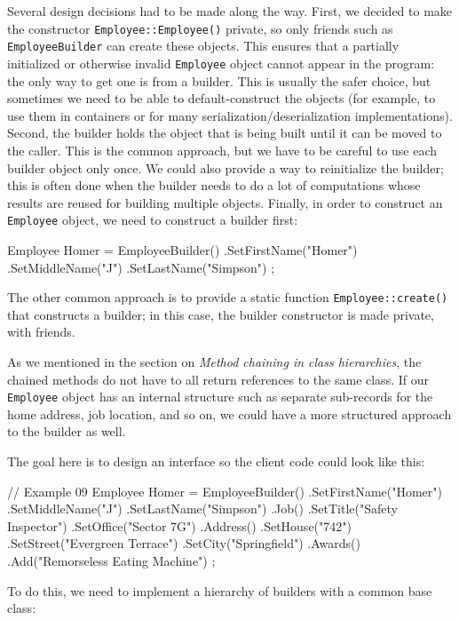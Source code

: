 Several design decisions had to be made along the way. First, we decided to make the constructor \texttt{Employee::Employee()} private, so only friends such as \texttt{EmployeeBuilder} can create these objects. This ensures that a partially initialized or otherwise invalid \texttt{Employee} object cannot appear in the program: the only way to get one is from a builder. This is usually the safer choice, but sometimes we need to be able to default-construct the objects (for example, to use them in containers or for many serialization/deserialization implementations). Second, the builder holds the object that is being built until it can be moved to the caller. This is the common approach, but we have to be careful to use each builder object only once. We could also provide a way to reinitialize the builder; this is often done when the builder needs to do a lot of computations whose results are reused for building multiple objects. Finally, in order to construct an \texttt{Employee} object, we need to construct a builder first:

\begin{code}
Employee Homer = EmployeeBuilder()
  .SetFirstName("Homer")
  .SetMiddleName("J")
  .SetLastName("Simpson")
;
\end{code}

The other common approach is to provide a static function \texttt{Employee::create()} that constructs a builder; in this case, the builder constructor is made private, with friends.

As we mentioned in the section on \emph{Method chaining in class hierarchies}, the chained methods do not have to all return references to the same class. If our \texttt{Employee} object has an internal structure such as separate sub-records for the home address, job location, and so on, we could have a more structured approach to the builder as well.

The goal here is to design an interface so the client code could look like this:

\begin{code}
// Example 09
Employee Homer = EmployeeBuilder()
  .SetFirstName("Homer")
  .SetMiddleName("J")
  .SetLastName("Simpson")
  .Job()
    .SetTitle("Safety Inspector")
    .SetOffice("Sector 7G")
  .Address()
    .SetHouse("742")
    .SetStreet("Evergreen Terrace")
    .SetCity("Springfield")
  .Awards()
    .Add("Remorseless Eating Machine")
;
\end{code}

To do this, we need to implement a hierarchy of builders with a common base class:


